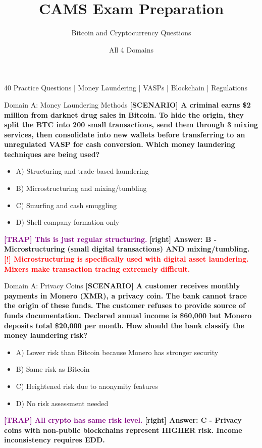 \documentclass[11pt,a4paper]{beamer}
\title[CAMS Exam Preparation]{CAMS Exam Preparation}
\subtitle{Bitcoin and Cryptocurrency Questions}
\author{All 4 Domains}
\date{}
\newcommand{\redflag}[1]{\textcolor{red}{\textbf{[!] #1}}}
\newcommand{\trap}[1]{\textcolor{purple}{\textbf{[TRAP] #1}}}
\newcommand{\correct}[1]{\textcolor{green!50!black}{\textbf{[right] #1}}}
\newcommand{\scenario}[1]{\textcolor{blue!70!black}{\textbf{[SCENARIO] #1}}}
\begin{document}
\begin{frame}
\titlepage
\centering
\footnotesize 40 Practice Questions | Money Laundering | VASPs | Blockchain | Regulations
\end{frame}

\begin{frame}{Domain A: Money Laundering Methods}
\scenario{A criminal earns \$2 million from darknet drug sales in Bitcoin. To hide the origin, they split the BTC into 200 small transactions, send them through 3 mixing services, then consolidate into new wallets before transferring to an unregulated VASP for cash conversion.}
\vspace{0.2cm}
\textbf{Which money laundering techniques are being used?}
\vspace{0.2cm}
\begin{itemize}
    \item A) Structuring and trade-based laundering
    \item B) Microstructuring and mixing/tumbling
    \item C) Smurfing and cash smuggling
    \item D) Shell company formation only
\end{itemize}
\vspace{0.2cm}
\trap{This is just regular structuring.}
\correct{Answer: B - Microstructuring (small digital transactions) AND mixing/tumbling.}
\redflag{Microstructuring is specifically used with digital asset laundering. Mixers make transaction tracing extremely difficult.}
\end{frame}

\begin{frame}{Domain A: Privacy Coins}
\scenario{A customer receives monthly payments in Monero (XMR), a privacy coin. The bank cannot trace the origin of these funds. The customer refuses to provide source of funds documentation. Declared annual income is \$60,000 but Monero deposits total \$20,000 per month.}
\vspace{0.2cm}
\textbf{How should the bank classify the money laundering risk?}
\vspace{0.2cm}
\begin{itemize}
    \item A) Lower risk than Bitcoin because Monero has stronger security
    \item B) Same risk as Bitcoin
    \item C) Heightened risk due to anonymity features
    \item D) No risk assessment needed
\end{itemize}
\vspace{0.2cm}
\trap{All crypto has same risk level.}
\correct{Answer: C - Privacy coins with non-public blockchains represent HIGHER risk. Income inconsistency requires EDD.}
\end{frame}
\end{document}
